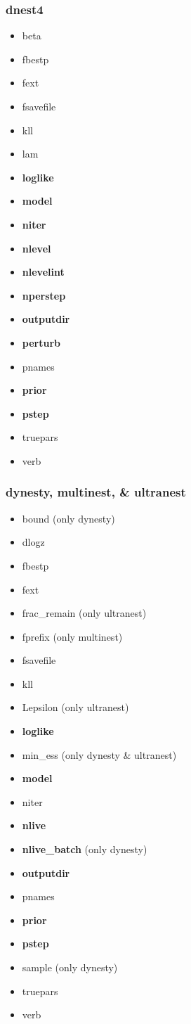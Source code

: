 \documentclass[letterpaper, 12pt]{article}
\begin{document}
\subsubsection{dnest4}
\begin{itemize}
\item beta
\item fbestp
\item fext
\item fsavefile
\item kll
\item lam
\item \textbf{loglike}
\item \textbf{model}
\item \textbf{niter}
\item \textbf{nlevel}
\item \textbf{nlevelint}
\item \textbf{nperstep}
\item \textbf{outputdir}
\item \textbf{perturb}
\item pnames
\item \textbf{prior}
\item \textbf{pstep}
\item truepars
\item verb
\end{itemize}

\subsubsection{dynesty, multinest, \& ultranest}
\label{sec:ns-inputs}
\begin{itemize}
\item bound (only dynesty)
\item dlogz
\item fbestp
\item fext
\item frac\_remain (only ultranest)
\item fprefix (only multinest)
\item fsavefile
\item kll
\item Lepsilon (only ultranest)
\item \textbf{loglike}
\item min\_ess (only dynesty \& ultranest)
\item \textbf{model}
\item niter
\item \textbf{nlive}
\item \textbf{nlive\_batch} (only dynesty)
\item \textbf{outputdir}
\item pnames
\item \textbf{prior}
\item \textbf{pstep}
\item sample (only dynesty)
\item truepars
\item verb
\end{itemize}
\end{document}
